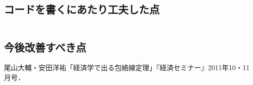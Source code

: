 \documentclass[11pt,a4j,fleqn]{jarticle}
\begin{document}
\subsection{コードを書くにあたり工夫した点}
\begin{quote}
\begin{verbatim}

\end{verbatim}
\end{quote}

\subsection{今後改善すべき点}
\begin{quote}

\end{quote}

\begin{thebibliography}{0}
尾山大輔・安田洋祐「経済学で出る包絡線定理」『経済セミナー』2011年10・11月号．
\end{thebibliography}
\end{document}
